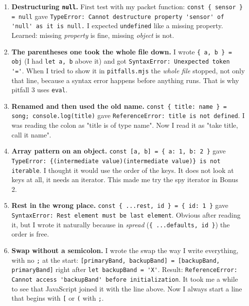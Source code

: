 \begin{enumerate}
\def\labelenumi{\arabic{enumi}.}
\tightlist
\item
  \textbf{Destructuring \passthrough{\lstinline!null!}.} First test with my packet function: \passthrough{\lstinline!const \{ sensor \} = null!} gave \passthrough{\lstinline!TypeError: Cannot destructure property 'sensor' of 'null' as it is null.!} I expected \passthrough{\lstinline!undefined!} like a missing property. Learned: missing \emph{property} is fine, missing \emph{object} is not.
\item
  \textbf{The parentheses one took the whole file down.} I wrote \passthrough{\lstinline!\{ a, b \} = obj!} (I had \passthrough{\lstinline!let a, b!} above it) and got \passthrough{\lstinline!SyntaxError: Unexpected token '='!}. When I tried to show it in \passthrough{\lstinline!pitfalls.mjs!} the \emph{whole file} stopped, not only that line, because a syntax error happens before anything runs. That is why pitfall 3 uses \passthrough{\lstinline!eval!}.
\item
  \textbf{Renamed and then used the old name.} \passthrough{\lstinline!const \{ title: name \} = song; console.log(title)!} gave \passthrough{\lstinline!ReferenceError: title is not defined!}. I was reading the colon as "title is of type name". Now I read it as "take title, call it name".
\item
  \textbf{Array pattern on an object.} \passthrough{\lstinline!const [a, b] = \{ a: 1, b: 2 \}!} gave \passthrough{\lstinline!TypeError: \{(intermediate value)(intermediate value)\} is not iterable!}. I thought it would use the order of the keys. It does not look at keys at all, it needs an iterator. This made me try the spy iterator in Bonus 2.
\item
  \textbf{Rest in the wrong place.} \passthrough{\lstinline!const \{ ...rest, id \} = \{ id: 1 \}!} gave \passthrough{\lstinline!SyntaxError: Rest element must be last element!}. Obvious after reading it, but I wrote it naturally because in \emph{spread} (\passthrough{\lstinline!\{ ...defaults, id \}!}) the order is free.
\item
  \textbf{Swap without a semicolon.} I wrote the swap the way I write everything, with no \passthrough{\lstinline!;!} at the start: \passthrough{\lstinline![primaryBand, backupBand] = [backupBand, primaryBand]!} right after \passthrough{\lstinline!let backupBand = 'X'!}. Result: \passthrough{\lstinline!ReferenceError: Cannot access 'backupBand' before initialization!}. It took me a while to see that JavaScript joined it with the line above. Now I always start a line that begins with \passthrough{\lstinline![!} or \passthrough{\lstinline!(!} with \passthrough{\lstinline!;!}.

\end{enumerate}
